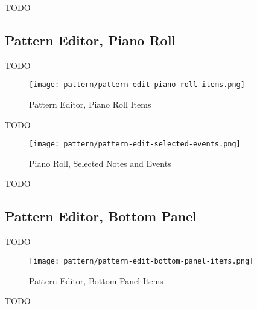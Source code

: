    TODO

\subsection{Pattern Editor, Piano Roll}
\label{subsec:seq24_pattern_editor_piano_roll}

   TODO

\begin{figure}[H]
   \centering 
   \texttt{[image: pattern/pattern-edit-piano-roll-items.png]}
   \caption{Pattern Editor, Piano Roll Items}
   \label{fig:pattern_editor_piano_roll_items}
\end{figure}

   TODO

\begin{figure}[H]
   \centering 
   \texttt{[image: pattern/pattern-edit-selected-events.png]}
   \caption{Piano Roll, Selected Notes and Events}
   \label{fig:pattern_editor_selected_events}
\end{figure}

   TODO

\subsection{Pattern Editor, Bottom Panel}
\label{subsec:seq24_pattern_editor_bottom}

   TODO

\begin{figure}[H]
   \centering 
   \texttt{[image: pattern/pattern-edit-bottom-panel-items.png]}
   \caption{Pattern Editor, Bottom Panel Items}
   \label{fig:pattern_editor_bottom_panel_items}
\end{figure}

   TODO


